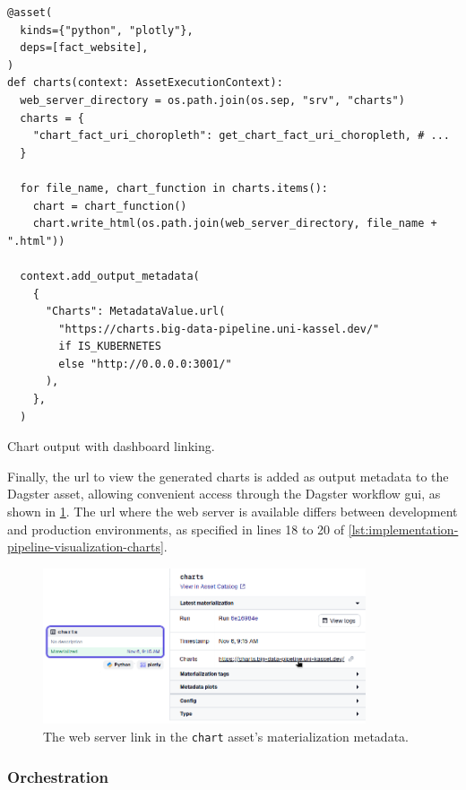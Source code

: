 \begin{listing}[H]
\begin{verbatim}
@asset(
  kinds={"python", "plotly"},
  deps=[fact_website],
)
def charts(context: AssetExecutionContext):
  web_server_directory = os.path.join(os.sep, "srv", "charts")
  charts = {
    "chart_fact_uri_choropleth": get_chart_fact_uri_choropleth, # ...
  }

  for file_name, chart_function in charts.items():
    chart = chart_function()
    chart.write_html(os.path.join(web_server_directory, file_name + ".html"))

  context.add_output_metadata(
    {
      "Charts": MetadataValue.url(
        "https://charts.big-data-pipeline.uni-kassel.dev/"
        if IS_KUBERNETES
        else "http://0.0.0.0:3001/"
      ),
    },
  )
\end{verbatim}
\caption{Chart output with dashboard linking.}
\label{lst:implementation-pipeline-visualization-charts}
\end{listing}

Finally, the \ac{url} to view the generated charts is added as output metadata to the Dagster asset, allowing convenient access through the Dagster workflow \ac{gui}, as shown in \cref{fig:implementation-visualization-metadata}.
The \ac{url} where the web server is available differs between development and production environments, as specified in lines 18 to 20 of \cref{lst:implementation-pipeline-visualization-charts}.

\begin{figure}[H]
  \centering
  \includegraphics[width=0.85\textwidth]{figures/dagster-asset-metadata.png}
  \caption{The web server link in the \texttt{chart} asset's materialization metadata.}
  \label{fig:implementation-visualization-metadata}
\end{figure}

\subsubsection{Orchestration}
\label{sec:implementation-pipeline-orchestration}

